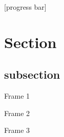 \documentclass[10pt]{beamer}
\begin{document}
[progress bar]



\section{Section}
\subsection{subsection}
\begin{frame}{Frame 1}

\end{frame}

\begin{frame}{Frame 2}

\end{frame}

\begin{frame}{Frame 3}

\end{frame}
\end{document}
